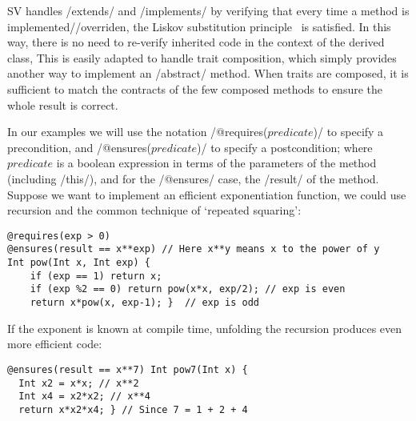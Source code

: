 SV handles /extends/ and /implements/ by verifying that every 
time a method is implemented//overriden, 
the Liskov substitution principle~\cite{Liskov:1994:BNS:197320.197383} is satisfied. In this way, there is no need to re-verify
inherited code in the context of the derived class, 
This is easily adapted
to handle trait composition, which simply provides another way to implement an /abstract/ method.
When traits are composed,
it is sufficient
to match the contracts of the few composed methods
to ensure the whole result is correct.

In our examples we will use the notation /@requires($predicate$)/ 
to specify a precondition, and /@ensures($predicate$)/ 
to specify a postcondition; where $predicate$ is a boolean expression
in terms of the parameters of the method (including /this/), and for the /@ensures/ case, the /result/ of the method.
Suppose we want to implement an efficient exponentiation function, we could use recursion and the common technique of `repeated squaring':
\vspace{-1ex}
\begin{lstlisting}
@requires(exp > 0)
@ensures(result == x**exp) // Here x**y means x to the power of y
Int pow(Int x, Int exp) {
	if (exp == 1) return x;
	if (exp %2 == 0) return pow(x*x, exp/2); // exp is even
	return x*pow(x, exp-1); }  // exp is odd
\end{lstlisting}
If the exponent is known at compile time,
unfolding the recursion produces even more efficient code:
\vspace{-1ex}
\begin{lstlisting}[firstnumber=7]
@ensures(result == x**7) Int pow7(Int x) { 
  Int x2 = x*x; // x**2
  Int x4 = x2*x2; // x**4
  return x*x2*x4; } // Since 7 = 1 + 2 + 4
\end{lstlisting}
\vspace{-1ex}


